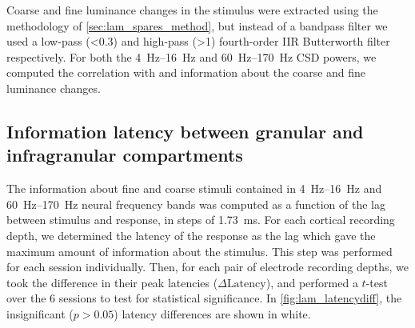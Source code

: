 Coarse and fine luminance changes in the stimulus were extracted using the methodology of \autoref{sec:lam_spares_method}, but instead of a bandpass filter we used a low-pass (\SI{<0.3}{\cpd}) and high-pass (\SI{>1}{\cpd}) fourth-order \ac{IIR} Butterworth filter respectively.
For both the \SIrange{4}{16}{Hz} and \SIrange{60}{170}{Hz} \ac{CSD} powers, we computed the correlation with and information about the coarse and fine luminance changes.


\subsection{Information latency between granular and infragranular compartments}
\label{sec:lam_latency_method}

The information about fine and coarse stimuli contained in \SIrange{4}{16}{Hz} and \SIrange{60}{170}{Hz} neural frequency bands was computed as a function of the lag between stimulus and response, in steps of \SI{1.73}{\milli\second}.
For each cortical recording depth, we determined the latency of the response as the lag which gave the maximum amount of information about the stimulus.
This step was performed for each session individually.
%
Then, for each pair of electrode recording depths, we took the difference in their peak latencies ($\Delta\text{Latency}$), and performed a $t$-test over the \num{6} sessions to test for statistical significance.
In \autoref{fig:lam_latencydiff}, the insignificant ($p>0.05$) latency differences are shown in white.
%


